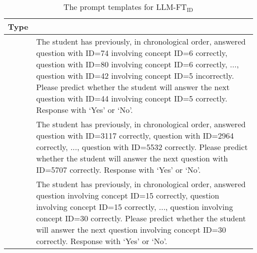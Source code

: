 \begin{table*}[hbt!]
\centering
\small
\begin{tabular}{| >{\centering\arraybackslash}m{} | >{\raggedright\arraybackslash}m{} |}
\hline
\rowcolor{lightgray} %
\textbf{Type} & \multicolumn{1}{c|}{\textbf{Template}} \\
\hline
1 & The student has previously, in chronological order, answered question with ID=74
involving concept ID=6 correctly, question with ID=80 involving concept ID=6 correctly,
...,
question with ID=42 involving concept ID=5 incorrectly.
Please predict whether the student will answer the next question with ID=44
involving concept ID=5 correctly.
Response with ‘Yes’ or ‘No’. \\
\hline
2 & The student has previously, in chronological order, answered question with ID=3117
correctly, question with ID=2964 correctly,
...,
question with ID=5532 correctly.
Please predict whether the student will answer the next question with ID=5707 correctly.
Response with ‘Yes’ or ‘No’. \\
\hline
3 & The student has previously, in chronological order, answered question involving concept ID=15
correctly, question involving concept ID=15 correctly,
...,
question involving concept ID=30 correctly.
Please predict whether the student will answer the next question involving concept ID=30 correctly.
Response with ‘Yes’ or ‘No’. \\
\hline
\end{tabular}
\caption{The prompt templates for LLM-FT$_\mathrm{ID}$}
\label{table:llm-kt-id-templates}
\end{table*}

